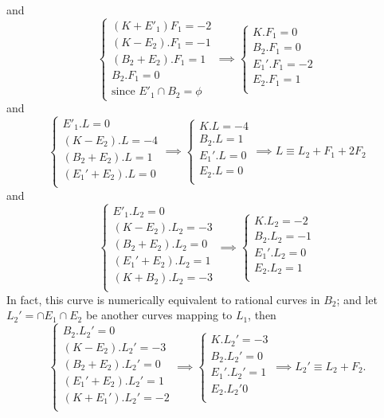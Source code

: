 \documentclass{article}
\begin{document}
and
\[
\begin{cases}
	(K+E'_1)F_1=-2\\
	(K-E_2).F_1=-1\\
	(B_2+E_2).F_1=1\\
	B_2.F_1=0\\
	\text{since }E'_1\cap B_2=\phi
\end{cases}
\implies
\begin{cases}
	K.F_1=0\\
	B_2.F_1=0\\
	E_1'.F_1=-2\\
	E_2.F_1=1\\
\end{cases}
\]
and 
\[ 
\begin{cases}
	E'_1.L=0\\
	(K-E_2).L=- 4 \\
	(B_2+E_2).L =1\\ 
	(E_1'+E_2).L =0\\ 
\end{cases}
\implies
\begin{cases} 
	K.L=-4\\
	B_2.L = 1\\ 
	E_1'.L=0\\ 
	E_2.L = 0\\
\end{cases} 
\implies L\equiv L_2+F_1+2F_2
\]
and
\[
\begin{cases}
	E'_1.L_2=0\\
	(K-E_2).L_2=-3\\
	(B_2+E_2).L_2=0\\
	(E_1'+E_2).L_2=1\\
	(K + B_2).L_2 =- 3\\
\end{cases}
\implies
\begin{cases}
	K.L_2=-2\\
	B_2.L_2=-1\\
	E_1'.L_2=0\\
	E_2.L_2=1\\
\end{cases}
\]
In fact, this curve is numerically equivalent to rational curves in $ B_2 $; and let $ L_2'=\cap E_1\cap E_2 $ be another curves mapping to $ L_1 $, then 
\[
\begin{cases}
	B_2.L_2'=0\\
	(K-E_2).L_2'=-3\\
	(B_2+E_2).L_2'=0\\
	(E_1'+E_2).L_2'=1\\
	(K + E_1').L_2' =- 2\\
\end{cases}
\implies
\begin{cases}
	K.L_2'=- 3\\
	B_2.L_2' = 0\\
	E_1'.L_2'= 1\\
	E_2.L_2' 0\\
\end{cases}
\implies L_2'\equiv L_2 + F_2.
\]
\end{document}
